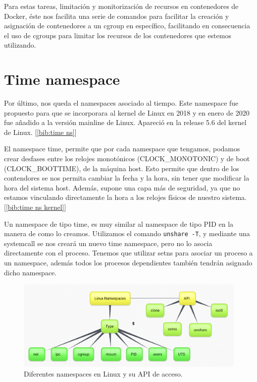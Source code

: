 \documentclass[a4paper, oneside, 12pt]{book}
\begin{document}
	\noindent Para estas tareas, limitación y monitorización de recursos en contenedores de Docker, éste nos facilita una serie de comandos para facilitar la creación y asignación de contenedores a un cgroup en específico, facilitando en consecuencia el uso de cgroups para limitar los recursos de los contenedores que estemos utilizando.
	
	
	
	\section{Time namespace}
	\par \noindent Por último, nos queda el namespaces asociado al tiempo. Este namespace fue propuesto para que se incorporara al kernel de Linux en 2018 y en enero de 2020 fue añadido a la versión mainline de Linux. Apareció en la release 5.6 del kernel de Linux. [\ref{bib:time ns}] \\
	
	\par \noindent El namespace time, permite que por cada namespace que tengamos, podamos crear desfases entre los relojes monotónicos (CLOCK\_MONOTONIC) y de boot (CLOCK\_BOOTTIME), de la máquina host. Esto permite que dentro de los contendores se nos permita cambiar la fecha y la hora, sin tener que modificar la hora del sistema host. Además, supone una capa más de seguridad, ya que no estamos vinculando directamente la hora a los relojes físicos de nuestro sistema. [\ref{bib:time ns kernel}]\\
	
	\par \noindent Un namespace de tipo time, es muy similar al namespace de tipo PID en la manera de como lo creamos. Utilizamos el comando \texttt{unshare -T}, y mediante una systemcall se nos creará un nuevo time namespace, pero no lo asocia directamente con el proceso. Tenemos que utilizar setns para asociar un proceso a un namespace, además todos los procesos dependientes también tendrán asignado dicho namespace. 
	
	\vspace{80px}
	
	\begin{figure}[h!]
		\begin{center}
			\includegraphics[width=1\textwidth]{img/linux-namespace1.png}
			\caption{Diferentes namespaces en Linux y su API de acceso.}
			\label{img: linux namespaces api}
		\end{center}
	\end{figure}
	
\end{document}
